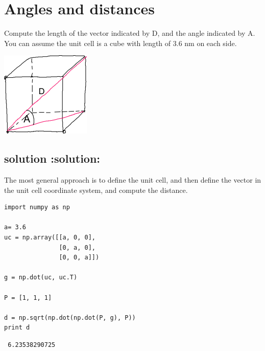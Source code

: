 \documentclass{article}
\begin{document}
\section{Angles and distances}
\label{sec-2}

Compute the length of the vector indicated by D, and the angle indicated by A. You can assume the unit cell is a cube with length of 3.6 nm on each side.

\includegraphics[width=.9\linewidth]{./images/hwk1-cube.png}
\subsection{solution \textbf{:solution:}}
\label{sec-2-1}

The most general approach is to define the unit cell, and then define the vector in the unit cell coordinate system, and compute the distance.


\begin{verbatim}
import numpy as np

a= 3.6
uc = np.array([[a, 0, 0],
               [0, a, 0],
               [0, 0, a]])

g = np.dot(uc, uc.T)

P = [1, 1, 1]

d = np.sqrt(np.dot(np.dot(P, g), P))
print d
\end{verbatim}

\begin{verbatim}
 6.23538290725
\end{verbatim}
\end{document}
